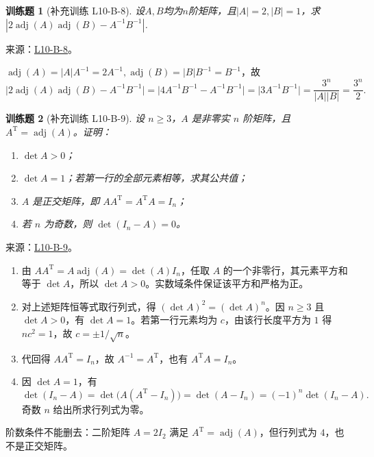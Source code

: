 \documentclass[UTF8,12pt,a4paper,fontset=fandol]{ctexart}
\newtheorem{exercise}{训练题}[section]
\begin{document}
\begin{exercise}[补充训练 L10-B-8]\label{prob:L10-B-8}
设$A,B$均为$n$阶矩阵，且$|A|=2,|B|=1$，求$|2\operatorname{adj}(A)\operatorname{adj}(B)-A^{-1}B^{-1}|$.
\end{exercise}
\noindent 来源：\href{https://github.com/yhwu-is/Linear-Algebra-Left-Undone/blob/new/%E8%AE%B2%E4%B9%89/%E4%B8%93%E9%A2%98/10%20%E8%A1%8C%E5%88%97%E5%BC%8F.tex}{L10-B-8}。
\begin{solve}
$\operatorname{adj}(A) = \lvert A \rvert A^{-1} = 2A^{-1}, \operatorname{adj}(B) = \lvert B \rvert B^{-1} = B^{-1}$，故 \[\lvert 2\operatorname{adj}(A)\operatorname{adj}(B)-A^{-1}B^{-1} \rvert = \lvert 4A^{-1}B^{-1}-A^{-1}B^{-1} \rvert = \lvert 3A^{-1}B^{-1} \rvert = \dfrac{3^n}{\lvert A \rvert \lvert B \rvert} = \dfrac{3^n}{2}.\]
\end{solve}

\begin{exercise}[补充训练 L10-B-9]\label{prob:L10-B-9}
设 $n\ge3$，$A$ 是非零实 $n$ 阶矩阵，且 $A^{\mathrm T}=\operatorname{adj}(A)$。证明：
\begin{enumerate}
\item $\det A>0$；
\item $\det A=1$；若第一行的全部元素相等，求其公共值；
\item $A$ 是正交矩阵，即 $AA^{\mathrm T}=A^{\mathrm T}A=I_n$；
\item 若 $n$ 为奇数，则 $\det(I_n-A)=0$。
\end{enumerate}
\end{exercise}
\noindent 来源：\href{https://github.com/yhwu-is/Linear-Algebra-Left-Undone/blob/new/%E8%AE%B2%E4%B9%89/%E4%B8%93%E9%A2%98/10%20%E8%A1%8C%E5%88%97%E5%BC%8F.tex}{L10-B-9}。
\begin{solve}
\begin{enumerate}
\item 由 $AA^{\mathrm T}=A\operatorname{adj}(A)=\det(A)I_n$，任取 $A$ 的一个非零行，其元素平方和等于 $\det A$，所以 $\det A>0$。实数域条件保证该平方和严格为正。
\item 对上述矩阵恒等式取行列式，得 $(\det A)^2=(\det A)^n$。因 $n\ge3$ 且 $\det A>0$，有 $\det A=1$。若第一行元素均为 $c$，由该行长度平方为 $1$ 得 $nc^2=1$，故 $c=\pm1/\sqrt n$。
\item 代回得 $AA^{\mathrm T}=I_n$，故 $A^{-1}=A^{\mathrm T}$，也有 $A^{\mathrm T}A=I_n$。
\item 因 $\det A=1$，有
\[\det(I_n-A)=\det\bigl(A(A^{\mathrm T}-I_n)\bigr)=\det(A-I_n)=(-1)^n\det(I_n-A).\]
奇数 $n$ 给出所求行列式为零。
\end{enumerate}
阶数条件不能删去：二阶矩阵 $A=2I_2$ 满足 $A^{\mathrm T}=\operatorname{adj}(A)$，但行列式为 $4$，也不是正交矩阵。
\end{solve}
\end{document}
